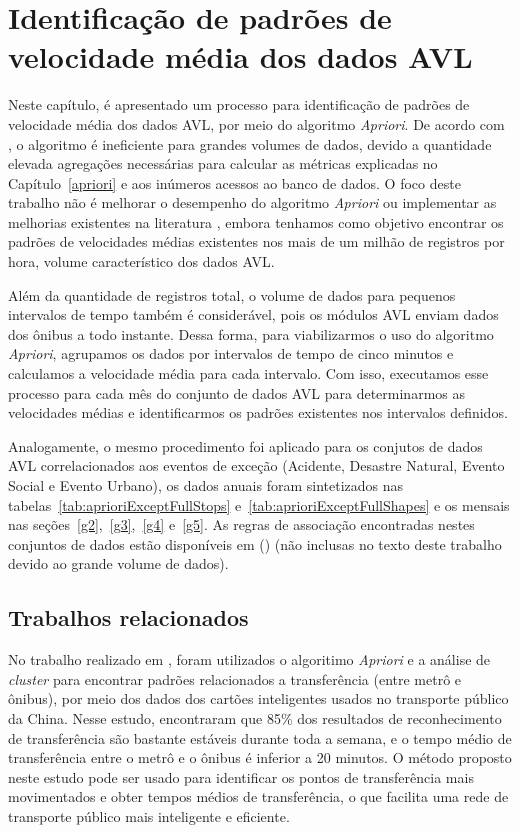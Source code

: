 \documentclass[
	12pt,				%
	oneside,			%
	a4paper,			%
	english,			%
	brazil				%
	]{abntex2ppgsi}
\begin{document}
{{{\chapter{Identificação de padrões de velocidade média dos dados AVL}
\label{expApriori}
Neste capítulo, é apresentado um processo para identificação de padrões de velocidade média dos dados AVL, por meio do algoritmo \textit{Apriori}. De acordo com \cite{xie2008optimization}, o algoritmo é ineficiente para grandes volumes de dados, devido a quantidade elevada agregações necessárias para calcular as métricas explicadas no Capítulo~\ref{apriori} e aos inúmeros acessos ao banco de dados. O foco deste trabalho não é melhorar o desempenho do algoritmo \textit{Apriori} ou implementar as melhorias existentes na literatura \cite{xie2008optimization, zhang2014method}, embora tenhamos como objetivo encontrar os padrões de velocidades médias existentes nos mais de um milhão de registros por hora, volume característico dos dados AVL.

Além da quantidade de registros total, o volume de dados para pequenos intervalos de tempo também é considerável, pois os módulos AVL enviam dados dos ônibus a todo instante. Dessa forma, para viabilizarmos o uso do algoritmo \textit{Apriori}, agrupamos os dados por intervalos de tempo de cinco minutos e calculamos a velocidade média para cada intervalo. Com isso, executamos esse processo para cada mês do conjunto de dados AVL para determinarmos as velocidades médias e identificarmos os padrões existentes nos intervalos definidos.

Analogamente, o mesmo procedimento foi aplicado para os conjutos de dados AVL correlacionados aos eventos de exceção (Acidente, Desastre Natural, Evento Social e Evento Urbano), os dados anuais foram sintetizados nas tabelas~\ref{tab:aprioriExceptFullStops} e~\ref{tab:aprioriExceptFullShapes} e os mensais nas seções~\ref{g2},~\ref{g3},~\ref{g4} e~\ref{g5}. As regras de associação encontradas nestes conjuntos de dados estão disponíveis em \citeauthor{fcas} (\citeyear{fcas}) (não inclusas no texto deste trabalho devido ao  grande volume de dados). 

\section{Trabalhos relacionados}

No trabalho realizado em \cite{zhao2019recognizing}, foram utilizados o algoritimo \textit{Apriori} e a análise de \textit{cluster} para encontrar padrões relacionados a transferência (entre metrô e ônibus), por meio dos dados dos cartões inteligentes usados no transporte público da China. Nesse estudo, encontraram que 85\% dos resultados de reconhecimento de transferência são bastante estáveis durante toda a semana, e o tempo médio de transferência entre o metrô e o ônibus é inferior a 20 minutos. O método proposto neste estudo pode ser usado para identificar os pontos de transferência mais movimentados e obter tempos médios de transferência, o que facilita uma rede de transporte público mais inteligente e eficiente.

}}}
\end{document}
